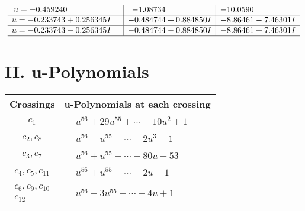 \documentclass[1p]{elsarticle_modified}
\theoremstyle{definition}
\begin{document}
$$\begin{array}{c|c|c}
\begin{aligned}
u &= -0.459240\phantom{ +0.000000I}\end{aligned}
 & -1.08734\phantom{ +0.000000I} & -10.0590\phantom{ +0.000000I} \\ \hline\begin{aligned}
u &= -0.233743 + 0.256345 I\end{aligned}
 & -0.484744 + 0.884850 I & -8.86461 - 7.46301 I \\ \hline\begin{aligned}
u &= -0.233743 - 0.256345 I\end{aligned}
 & -0.484744 - 0.884850 I & -8.86461 + 7.46301 I\\
 \hline 
 \end{array}$$\newpage
\newpage\renewcommand{\arraystretch}{1}
\centering \section*{ II. u-Polynomials}
\begin{tabular}{m{50pt}|m{274pt}}
Crossings & \hspace{64pt}u-Polynomials at each crossing \\
\hline $$\begin{aligned}c_{1}\end{aligned}$$&$\begin{aligned}
&u^{56}+29 u^{55}+\cdots-10 u^2+1
\end{aligned}$\\
\hline $$\begin{aligned}c_{2},c_{8}\end{aligned}$$&$\begin{aligned}
&u^{56}- u^{55}+\cdots-2 u^3-1
\end{aligned}$\\
\hline $$\begin{aligned}c_{3},c_{7}\end{aligned}$$&$\begin{aligned}
&u^{56}+u^{55}+\cdots+80 u-53
\end{aligned}$\\
\hline $$\begin{aligned}c_{4},c_{5},c_{11}\end{aligned}$$&$\begin{aligned}
&u^{56}+u^{55}+\cdots-2 u-1
\end{aligned}$\\
\hline $$\begin{aligned}c_{6},c_{9},c_{10}\\c_{12}\end{aligned}$$&$\begin{aligned}
&u^{56}-3 u^{55}+\cdots-4 u+1
\end{aligned}$\\
\hline
\end{tabular}\newpage\renewcommand{\arraystretch}{1}
\end{document}
